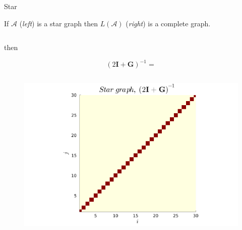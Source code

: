 \documentclass{beamer}
\newcommand{\matr}[1]{\bm{#1}}
\newcommand{\I}{\matr{I}}
\newcommand{\G}{\matr{G}}
\newcommand{\outdiag}{../thesis/sections/diagrams}
\begin{document}
\begin{frame}[allowframebreaks]{Star}

    If $\mathcal{A}$ (\textit{left}) is a star graph then $L(\mathcal{A})$ (\textit{right}) is a complete graph. \vspace{5mm}

    \begin{columns}[T,onlytextwidth]

        \begin{column}{.46\textwidth}
            \resizebox{\linewidth}{!}{}
        \end{column}

        \hfill

        \begin{column}{.46\textwidth}
            \resizebox{\linewidth}{!}{}
        \end{column}
    \end{columns}

    then

    \begin{equation*}
        (2\I + \G)^{-1} =
    \end{equation*}

    \begin{columns}
        \begin{column}{.46\textwidth}
            \begin{figure}
                \includegraphics[width = \linewidth]{../../plots/bargmatrices/star.png}
            \end{figure}
        \end{column}

        \hfill


\end{columns}
\end{frame}
\end{document}
